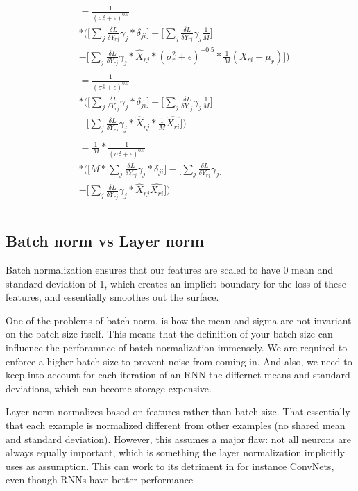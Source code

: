 \begin{align*}
    &= \frac{1}{(\sigma_r^2 + \epsilon)^{0.5}} \\
    &* \Bigg(\Bigg[
        \sum_{j} \frac{\delta L}{\delta Y_{rj}} \gamma_j * \delta_{ji}
    \Bigg] 
    - \Bigg[
        \sum_{j} \frac{\delta L}{\delta Y_{rj}} \gamma_j \frac{1}{M} 
    \Bigg] \\
    &- \Bigg[
        \sum_{j} \frac{\delta L}{\delta Y_{rj}} \gamma_j *
        \hat{X}_{rj} *(\sigma_r^2 + \epsilon)^{-0.5 } * \frac{1}{M} (X_{ri} - \mu_r)
    \Bigg] \Bigg) \\
    \\
    &= \frac{1}{(\sigma_r^2 + \epsilon)^{0.5}} \\
    &* \Bigg(\Bigg[
        \sum_{j} \frac{\delta L}{\delta Y_{rj}} \gamma_j * \delta_{ji}
    \Bigg] 
    - \Bigg[
        \sum_{j} \frac{\delta L}{\delta Y_{rj}} \gamma_j \frac{1}{M} 
    \Bigg] \\
    &- \Bigg[
        \sum_{j} \frac{\delta L}{\delta Y_{rj}} \gamma_j *
        \hat{X}_{rj} * \frac{1}{M} \hat{X_{ri}}
    \Bigg] \Bigg) \\
    \\
    &= \frac{1}{M} * \frac{1}{(\sigma_r^2 + \epsilon)^{0.5}} \\
    &* \Bigg(\Bigg[
        M * \sum_{j} \frac{\delta L}{\delta Y_{rj}} \gamma_j * \delta_{ji}
    \Bigg] 
    - \Bigg[
        \sum_{j} \frac{\delta L}{\delta Y_{rj}} \gamma_j 
    \Bigg] \\
    &- \Bigg[
        \sum_{j} \frac{\delta L}{\delta Y_{rj}} \gamma_j *
        \hat{X}_{rj} \hat{X_{ri}}
    \Bigg] \Bigg) \\
    \\
\end{align*}

\subsection{Batch norm vs Layer norm}
Batch normalization ensures that our features are scaled to have 0 mean and standard deviation of 1, 
which creates an implicit boundary for the loss of these features, and essentially smoothes out the
surface. 

One of the problems of batch-norm, is how the mean and sigma are not invariant on the batch size itself.
This means that the definition of your batch-size can influence the perforamnce of batch-normalization
immensely. We are required to enforce a higher batch-size to prevent noise from coming in. And also,
we need to keep into account for each iteration of an RNN the differnet means and standard deviations,
which can become storage expensive.

Layer norm normalizes based on features rather than batch size. That essentially that each example is
normalized different from other examples (no shared mean and standard deviation). However, this assumes
a major flaw: not all neurons are always equally important, which is something the layer normalization implicitly
uses as assumption. This can work to its detriment in for instance ConvNets, even though RNNs have better performance